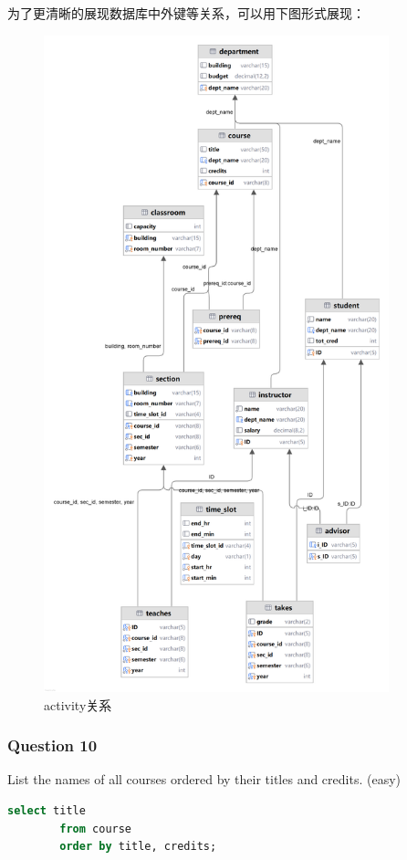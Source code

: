 \documentclass{article}
\begin{document}
    
    为了更清晰的展现数据库中外键等关系，可以用下图形式展现：
    
    \begin{figure}[H]
    	\centering
    	\includegraphics[width=10cm]{./images/13.college关系.png}
    	\caption{activity关系}
    \end{figure}
    
    \subsubsection{Question 10}
    
    List the names of all courses ordered by their titles and credits.  (easy)
    
    \begin{lstlisting}[language=sql, title=Question 10, tabsize=4]
    	select title
    	from course
    	order by title, credits;
    \end{lstlisting}
    
\end{document}
